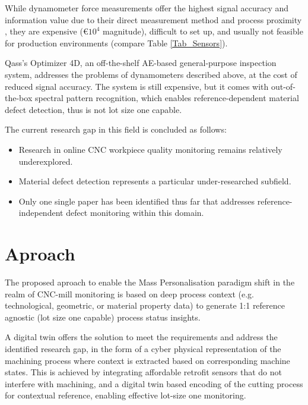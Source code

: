 \documentclass[5p,times,procedia]{elsarticle}
\begin{document}
While dynamometer force measurements offer the highest signal accuracy and information value due to their direct measurement method and process proximity \cite[]{Korkmaz.Yasar.ea2020}, they are expensive (\euro $10^4$ magnitude), difficult to set up, and usually not feasible for production environments (compare Table \ref{Tab_Sensors}).

Qass's Optimizer 4D, an off-the-shelf AE-based general-purpose inspection system, addresses the problems of dynamometers described above, at the cost of reduced signal accuracy. The system is still expensive, but it comes with out-of-the-box spectral pattern recognition, which enables reference-dependent material defect detection, thus is not lot size one capable. \cite[p.5]{Szulewski.Sniegulska-Gradzka2017}

\vspace*{.5\baselineskip}
\noindent The current research gap in this field is concluded as follows: \label{gap}
\vspace*{-\baselineskip}
\begin{itemize}
	\item Research in online CNC workpiece quality monitoring remains relatively underexplored.
	\item Material defect detection represents a particular under-researched subfield.
	\item Only one single paper has been identified thus far that addresses reference-independent defect monitoring within this domain. %
\end{itemize}










\section{Aproach}\label{Sec_Aproach}
The proposed aproach to enable the Mass Personalisation paradigm shift in the realm of CNC-mill monitoring is based on deep process context (e.g. technological, geometric, or material property data) to generate 1:1 reference agnostic (lot size one capable) process status insights.

A digital twin offers the solution to meet the requirements and address the identified research gap, in the form of a cyber physical representation of the machining process where context is extracted based on corresponding machine states.
This is achieved by integrating affordable retrofit sensors that do not interfere with machining, and a digital twin based encoding of the cutting process for contextual reference, enabling effective lot-size one monitoring.
\end{document}
